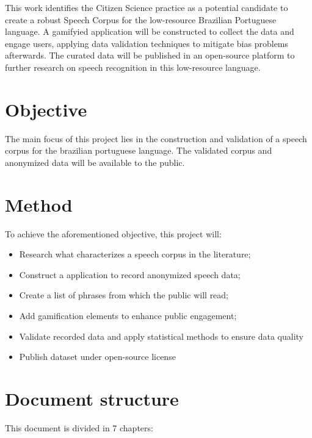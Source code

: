 This work identifies the Citizen Science practice as a potential candidate to create a robust Speech Corpus for the low-resource Brazilian Portuguese language. A gamifyied application will be constructed to collect the data and engage users, applying data validation techniques to mitigate bias problems afterwards. The curated data will be published in an open-source platform to further research on speech recognition in this low-resource language.

\section*{Objective}

The main focus of this project lies in the construction and validation of a speech corpus for the brazilian portuguese language. The validated corpus and anonymized data will be available to the public.

\section*{Method}

To achieve the aforementioned objective, this project will:

\begin{itemize}
    \item Research what characterizes a speech corpus in the literature;
    \item Construct a application to record anonymized speech data;
    \item Create a list of phrases from which the public will read;
    \item Add gamification elements to enhance public engagement;
    \item Validate recorded data and apply statistical methods to ensure data quality
    \item Publish dataset under open-source license
\end{itemize}

\section*{Document structure}

This document is divided in 7 chapters:

